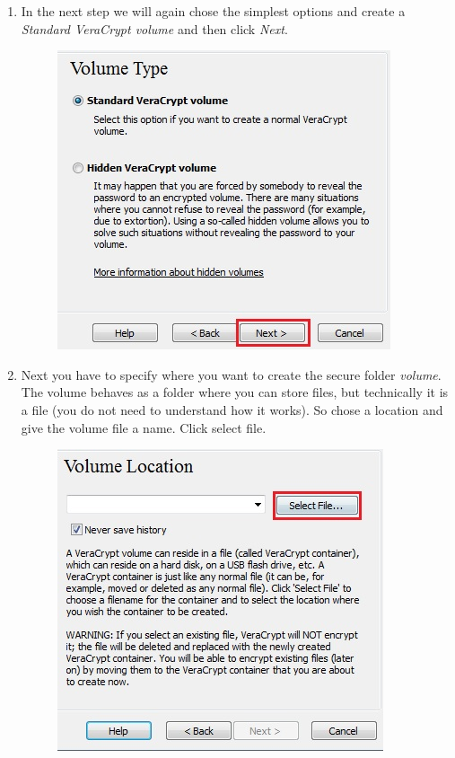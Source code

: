 \documentclass{tufte-handout}
\begin{document}
\begin{enumerate}
	\newpage
	
	\item In the next step we will again chose the simplest options and create a \textit{Standard VeraCrypt volume} and then click \textit{Next}.
	\begin{figure}
		\includegraphics[width=.75\linewidth]{img/vc_install_3.png}
	\end{figure}
	\FloatBarrier
	
	\item Next you have to specify where you want to create the secure folder \textit{volume}. The volume behaves as a folder where you can store files, but technically it is a file (you do not need to understand how it works). So chose a location and give the volume file a name. Click select file. 
	\begin{figure}%
		\includegraphics[width=.75\linewidth]{img/vc_install_4.png}
	\end{figure} 
	\FloatBarrier
	

\end{enumerate}
\end{document}
